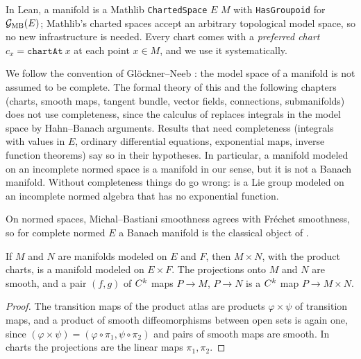 In Lean, a manifold is a Mathlib \texttt{ChartedSpace} $E$ $M$ with \texttt{HasGroupoid} for
$\mathcal{G}_{\mathrm{MB}}(E)$; Mathlib's charted spaces accept an arbitrary topological model space, so
no new infrastructure is needed. Every chart comes with a \emph{preferred chart}
$c_x = \texttt{chartAt}\ x$ at each point $x \in M$, and we use it systematically.

\begin{remark}
  \label{rem:man-complete}
  We follow the convention of Glöckner--Neeb \cite[\S5.7]{GN26}: the model space of a manifold
  is not assumed to be complete. The formal theory of this and the following chapters (charts,
  smooth maps, tangent bundle, vector fields, connections, submanifolds) does not use
  completeness, since the calculus of \cite{LCA} replaces integrals in the model space by
  Hahn--Banach arguments. Results that need completeness (integrals with values in $E$,
  ordinary differential equations, exponential maps, inverse function theorems) say so in their
  hypotheses. In particular, a manifold modeled on an incomplete normed space is a manifold in
  our sense, but it is not a Banach manifold. Without completeness things do go wrong:
  \cite[Example 5.6.8]{GN26} is a Lie group modeled on an incomplete normed algebra that has no
  exponential function.
\end{remark}

On normed spaces, Michal--Bastiani smoothness agrees with Fréchet smoothness, so for complete
normed $E$ a Banach manifold is the classical object of \cite{Lan99}.

\begin{proposition}[Products]
  \label{prop:man-product}
  \leanok
  If $M$ and $N$ are manifolds modeled on $E$ and $F$, then $M \times N$, with the product
  charts, is a manifold modeled on $E \times F$. The projections onto $M$ and $N$ are smooth, and
  a pair $(f, g)$ of $C^{k}$ maps $P \to M$, $P \to N$ is a $C^{k}$ map $P \to M \times N$.
\end{proposition}

\begin{proof}
  \leanok
  The transition maps of the product atlas are products $\varphi \times \psi$ of transition
  maps, and a product of smooth diffeomorphisms between open sets is again one, since
  $(\varphi \times \psi) = (\varphi \circ \pi_1, \psi \circ \pi_2)$ and pairs of smooth maps are
  smooth. In charts the projections are the linear maps $\pi_1, \pi_2$.
\end{proof}

